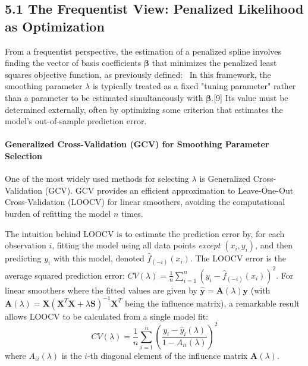\documentclass[11pt, a4paper]{article}
\begin{document}
\begin{itemize}
\subsection{5.1 The Frequentist View: Penalized Likelihood as Optimization}
From a frequentist perspective, the estimation of a penalized spline involves finding the vector of basis coefficients $\boldsymbol{\beta}$ that minimizes the penalized least squares objective function, as previously defined:
\
In this framework, the smoothing parameter $\lambda$ is typically treated as a fixed "tuning parameter" rather than a parameter to be estimated simultaneously with $\boldsymbol{\beta}$.[9] Its value must be determined externally, often by optimizing some criterion that estimates the model's out-of-sample prediction error.

\paragraph{Generalized Cross-Validation (GCV) for Smoothing Parameter Selection}
One of the most widely used methods for selecting $\lambda$ is Generalized Cross-Validation (GCV). GCV provides an efficient approximation to Leave-One-Out Cross-Validation (LOOCV) for linear smoothers, avoiding the computational burden of refitting the model $n$ times.

The intuition behind LOOCV is to estimate the prediction error by, for each observation $i$, fitting the model using all data points \textit{except} $(x_i, y_i)$, and then predicting $y_i$ with this model, denoted $\hat{f}_{(-i)}(x_i)$. The LOOCV error is the average squared prediction error: $CV(\lambda) = \frac{1}{n} \sum_{i=1}^n (y_i - \hat{f}_{(-i)}(x_i))^2$.
For linear smoothers where the fitted values are given by $\hat{\mathbf{y}} = \mathbf{A}(\lambda)\mathbf{y}$ (with $\mathbf{A}(\lambda) = \mathbf{X}(\mathbf{X}^T\mathbf{X} + \lambda\mathbf{S})^{-1}\mathbf{X}^T$ being the influence matrix), a remarkable result allows LOOCV to be calculated from a single model fit:
\[ CV(\lambda) = \frac{1}{n} \sum_{i=1}^n \left( \frac{y_i - \hat{y}_i(\lambda)}{1 - A_{ii}(\lambda)} \right)^2 \]
where $A_{ii}(\lambda)$ is the $i$-th diagonal element of the influence matrix $\mathbf{A}(\lambda)$.


\end{itemize}
\end{document}

